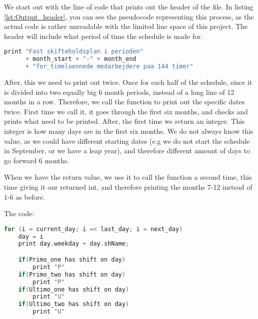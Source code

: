 We start out with the line of code that prints out the header of the file. In listing \ref{lst:Output_header}, you can see the pseudocode representing this process, as the actual code is rather unreadable with the limited line space of this project. The header will include what period of time the schedule is made for.


\begin{lstlisting}[caption={Writing of header in pseudocode},label={lst:Output_header},language=C]
print "Fast skifteholdsplan i perioden" 
      + month_start + "-" + month_end
      + "for_timeloennede medarbejdere paa 144 timer"
\end{lstlisting}


After, this we need to print out twice. Once for each half of the schedule, since it is divided into two equally big 6 month periods, instead of a long line of 12 months in a row. Therefore, we call the function to print out the specific dates twice. First time we call it, it goes through the first six months, and checks and prints what need to be printed. After, the first time we return an integer. This integer is how many days are in the first six months. We do not always know this value, as we could have different starting dates (e.g we do not start the schedule in September, or we have a leap year), and therefore different amount of days to go forward 6 months. 

When we have the return value, we use it to call the function a second time, this time giving it our returned int, and therefore printing the months 7-12 instead of 1-6 as before.

The code:
\begin{lstlisting}[caption={Printing of dates written in pseudocode},label={lst:Date_print},language=C]
for (i = current_day; i =< last_day; i = next_day)
    day = i
    print day.weekday + day.shName;

    if(Primo_one has shift on day)
        print "P"
    if(Primo_two has shift on day)
        print "P"
    if(Ultimo_one has shift on day)
        print "U"
    if(Ultimo_two has shift on day)
        print "U"
\end{lstlisting}


%
                